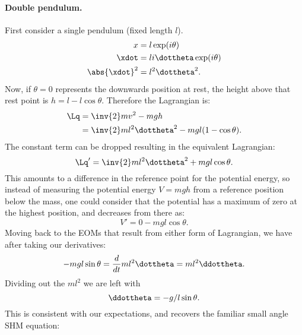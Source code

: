 {\paragraph{Double pendulum.}
%
First consider a single pendulum (fixed length \(l\)).
%
\begin{equation}\label{eqn:tongMf1:360}
\begin{aligned}
x &= l \exp(i\theta) \\
\xdot &= l i \dottheta \exp(i\theta) \\
\abs{\xdot}^2 &= l^2 \dottheta^2 .
\end{aligned}
\end{equation}
%
Now, if \(\theta = 0\) represents the downwards position at rest, the height above that rest point is \(h = l - l \cos\theta\).  Therefore the Lagrangian is:
%
\begin{equation}\label{eqn:tongMf1:380}
\begin{aligned}
\Lq
&= \inv{2} m v^2 - mgh \\
&= \inv{2} m l^2 \dottheta^2 - mg l (1 - \cos\theta) .
\end{aligned}
\end{equation}
%
The constant term can be dropped resulting in the equivalent Lagrangian:
%
\begin{equation}\label{eqn:tongMf1:1300}
\Lq' = \inv{2} m l^2 \dottheta^2 + mg l \cos\theta.
\end{equation}
%
This amounts to a difference in the reference point for the potential energy, so
instead of measuring the potential energy \(V = m g h\) from a reference position below the mass, one could consider that the potential has a maximum of zero at the highest position, and decreases from there as:
%
\begin{equation}\label{eqn:tongMf1:1320}
V' = 0 - m g l \cos\theta.
\end{equation}
%
Moving back to the EOMs that result from either form of Lagrangian, we have after taking our derivatives:
%
\begin{equation}\label{eqn:tongMf1:1340}
-m g l \sin\theta = \frac{d}{dt} m l^2 \dottheta = m l^2 \ddottheta.
\end{equation}
%
Dividing out the \( m l^2 \) we are left with
%
\begin{equation}\label{eqn:tongMf1:1360}
\ddottheta = - g/l \sin\theta.
\end{equation}
%
This is consistent with our expectations, and recovers the familiar small angle SHM equation:
%
\begin{equation}\label{eqn:tongMf1:1380}

\end{equation}}
